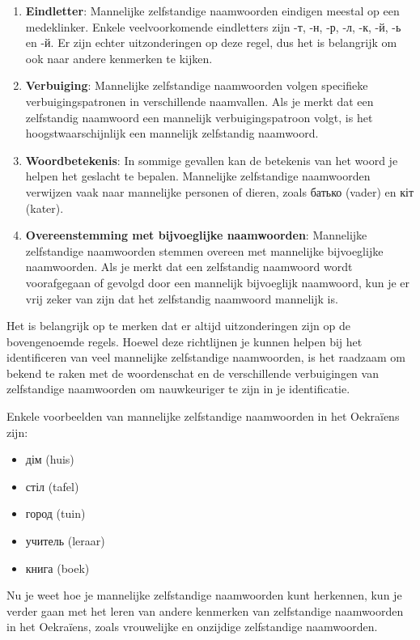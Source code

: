 \documentclass[
  letterpaper,
  DIV=11,
  numbers=noendperiod]{scrreprt}
\providecommand{\tightlist}{%
  \setlength{\itemsep}{0pt}\setlength{\parskip}{0pt}}\usepackage{longtable,booktabs,array}
\begin{document}
\begin{enumerate}
\def\labelenumi{\arabic{enumi}.}
\item
  \textbf{Eindletter}: Mannelijke zelfstandige naamwoorden eindigen
  meestal op een medeklinker. Enkele veelvoorkomende eindletters zijn
  -т, -н, -р, -л, -к, -й, -ь en -й. Er zijn echter uitzonderingen op
  deze regel, dus het is belangrijk om ook naar andere kenmerken te
  kijken.
\item
  \textbf{Verbuiging}: Mannelijke zelfstandige naamwoorden volgen
  specifieke verbuigingspatronen in verschillende naamvallen. Als je
  merkt dat een zelfstandig naamwoord een mannelijk verbuigingspatroon
  volgt, is het hoogstwaarschijnlijk een mannelijk zelfstandig
  naamwoord.
\item
  \textbf{Woordbetekenis}: In sommige gevallen kan de betekenis van het
  woord je helpen het geslacht te bepalen. Mannelijke zelfstandige
  naamwoorden verwijzen vaak naar mannelijke personen of dieren, zoals
  батько (vader) en кіт (kater).
\item
  \textbf{Overeenstemming met bijvoeglijke naamwoorden}: Mannelijke
  zelfstandige naamwoorden stemmen overeen met mannelijke bijvoeglijke
  naamwoorden. Als je merkt dat een zelfstandig naamwoord wordt
  voorafgegaan of gevolgd door een mannelijk bijvoeglijk naamwoord, kun
  je er vrij zeker van zijn dat het zelfstandig naamwoord mannelijk is.
\end{enumerate}

Het is belangrijk op te merken dat er altijd uitzonderingen zijn op de
bovengenoemde regels. Hoewel deze richtlijnen je kunnen helpen bij het
identificeren van veel mannelijke zelfstandige naamwoorden, is het
raadzaam om bekend te raken met de woordenschat en de verschillende
verbuigingen van zelfstandige naamwoorden om nauwkeuriger te zijn in je
identificatie.

Enkele voorbeelden van mannelijke zelfstandige naamwoorden in het
Oekraïens zijn:

\begin{itemize}
\tightlist
\item
  дім (huis)
\item
  стіл (tafel)
\item
  город (tuin)
\item
  учитель (leraar)
\item
  книга (boek)
\end{itemize}

Nu je weet hoe je mannelijke zelfstandige naamwoorden kunt herkennen,
kun je verder gaan met het leren van andere kenmerken van zelfstandige
naamwoorden in het Oekraïens, zoals vrouwelijke en onzijdige
zelfstandige naamwoorden.
\end{document}
